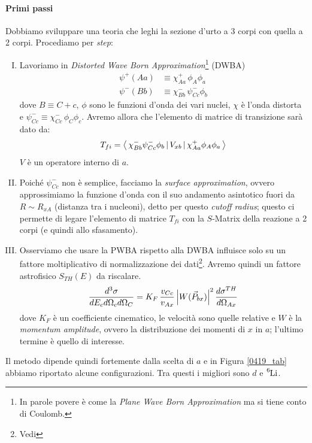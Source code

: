\paragraph{Primi passi} 
Dobbiamo sviluppare una teoria che leghi la sezione d'urto a 3 corpi con quella a 2 corpi. Procediamo per \textit{step}:
\begin{enumerate}[I.]
	\item Lavoriamo in \textit{Distorted Wave Born Approximation}\footnote{In parole povere è come la \textit{Plane Wave Born Approximation} ma si tiene conto di Coulomb.} (DWBA)
	\begin{align*}
		\psi^+(Aa) &\equiv \chi_{Aa}^+\, \phi_A \phi_a \\
		\psi^-(Bb) &\equiv \chi_{Bb}^-\, \psi_{Cc}^- \phi_b
	\end{align*}
	dove $B\equiv C+c$, $\phi$ sono le funzioni d'onda dei vari nuclei, $\chi$ è l'onda distorta e $\psi_{Cc}^- \equiv \chi_{Cc}^-\, \phi_C \phi_c$. Avremo allora che l'elemento di matrice di transizione sarà dato da:
	$$T_{fi} = \bigl\langle\, \chi_{Bb}^- \psi_{Cc}^- \phi_b\, |\,V_{xb}\, |\,\chi_{Aa}^+\phi_A\phi_a\, \bigr\rangle$$
	$V$ è un operatore interno di $a$.
	\item Poiché $\psi_{Cc}^-$ non è semplice, facciamo la \textit{surface approximation}, ovvero approssimiamo la funzione d'onda con il suo andamento asintotico fuori da $R\sim R_{xA}$ (distanza tra i nucleoni), detto per questo \textit{cutoff radius}; questo ci permette di legare l'elemento di matrice $T_{fi}$ con la $S$-Matrix della reazione a 2 corpi (e quindi allo sfasamento).
	\item Osserviamo che usare la PWBA rispetto alla DWBA influisce solo su un fattore moltiplicativo di normalizzazione dei dati\footnote{Vedi }. Avremo quindi un fattore astrofisico $S_{TH}(E)$ da riscalare.
	$$\frac{d^3\sigma}{dE_c d\Omega_cd\Omega_{C}} = {K_F}\, \frac{v_{Cc}}{v_{Ax}}\, \Bigl | W(\vec{P}_{bx}) \Bigr |^2\, \frac{d\sigma^{TH}}{d\Omega_{Ax}}$$ %
	dove $K_F$ è un coefficiente cinematico, le velocità sono quelle relative e $W$ è la \textit{momentum amplitude}, ovvero la distribuzione dei momenti di $x$ in $a$; l'ultimo termine è quello di interesse.
\end{enumerate}
\noindent Il metodo dipende quindi fortemente dalla scelta di $a$ e in Figura \ref{0419_tab} abbiamo riportato alcune configurazioni. Tra questi i migliori sono $d$ e $\ce{^6Li}$.

